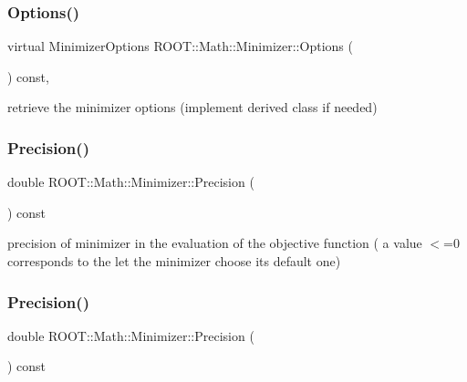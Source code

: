 \mbox{\label{classROOT_1_1Math_1_1Minimizer_a9b0653bcf3d2c0b4df79c1db2068ff27}} 
\subsubsection{\texorpdfstring{Options()}{Options()}\hspace{0.1cm}{\footnotesize\ttfamily [2/2]}}
{\footnotesize\ttfamily virtual Minimizer\+Options R\+O\+O\+T\+::\+Math\+::\+Minimizer\+::\+Options (\begin{DoxyParamCaption}{ }\end{DoxyParamCaption}) const\hspace{0.3cm}{\ttfamily [inline]}, {\ttfamily [virtual]}}



retrieve the minimizer options (implement derived class if needed) 

\mbox{\label{classROOT_1_1Math_1_1Minimizer_a10c2c6ff21d1946c61639678435bbf4b}} 
\subsubsection{\texorpdfstring{Precision()}{Precision()}\hspace{0.1cm}{\footnotesize\ttfamily [1/2]}}
{\footnotesize\ttfamily double R\+O\+O\+T\+::\+Math\+::\+Minimizer\+::\+Precision (\begin{DoxyParamCaption}{ }\end{DoxyParamCaption}) const\hspace{0.3cm}{\ttfamily [inline]}}

precision of minimizer in the evaluation of the objective function ( a value $<$=0 corresponds to the let the minimizer choose its default one) \mbox{\label{classROOT_1_1Math_1_1Minimizer_a10c2c6ff21d1946c61639678435bbf4b}} 
\subsubsection{\texorpdfstring{Precision()}{Precision()}\hspace{0.1cm}{\footnotesize\ttfamily [2/2]}}
{\footnotesize\ttfamily double R\+O\+O\+T\+::\+Math\+::\+Minimizer\+::\+Precision (\begin{DoxyParamCaption}{ }\end{DoxyParamCaption}) const\hspace{0.3cm}{\ttfamily [inline]}}

